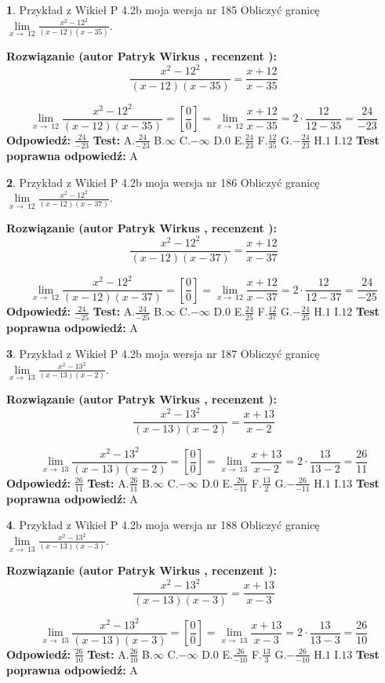 \documentclass[12pt, a4paper]{article}
\theoremstyle{definition} %
\newtheorem{zad}{}
\newcommand{\zadStart}[1]{\begin{zad}#1\newline}
\newcommand{\zadStop}{\end{zad}}
\newcommand{\rozwStart}[2]{\noindent \textbf{Rozwiązanie (autor #1 , recenzent #2): }\newline}
\newcommand{\rozwStop}{\newline}
\newcommand{\odpStart}{\noindent \textbf{Odpowiedź:}\newline}
\newcommand{\odpStop}{\newline}
\newcommand{\testStart}{\noindent \textbf{Test:}\newline}
\newcommand{\testStop}{\newline}
\newcommand{\kluczStart}{\noindent \textbf{Test poprawna odpowiedź:}\newline}
\newcommand{\kluczStop}{\newline}
\begin{document}
\zadStart{Przykład z Wikieł P 4.2b moja wersja nr 185}
Obliczyć granicę $\lim\limits_{x\to\ 12}\frac{x^{2}-12^{2}}{(x-12)(x-35)}$.
\zadStop
\rozwStart{Patryk Wirkus}{}
$$\frac{x^{2}-12^{2}}{(x-12)(x-35)}=\frac{x+12}{x-35}$$

$$\lim\limits_{x\to\ 12}\frac{x^{2}-12^{2}}{(x-12)(x-35)}=[\frac{0}{0}]=\lim\limits_{x\to\ 12}\frac{x+12}{x-35}=2 \cdot \frac{12}{12-35} = \frac{24}{-23}$$
\rozwStop
\odpStart
$\frac{24}{-23}$
\odpStop
\testStart
A.$\frac{24}{-23}$
B.$\infty$
C.$-\infty$
D.$0$
E.$\frac{24}{23}$
F.$\frac{12}{35}$
G.$-\frac{24}{23}$
H.$1$
I.$12$
\testStop
\kluczStart
A
\kluczStop



\zadStart{Przykład z Wikieł P 4.2b moja wersja nr 186}
Obliczyć granicę $\lim\limits_{x\to\ 12}\frac{x^{2}-12^{2}}{(x-12)(x-37)}$.
\zadStop
\rozwStart{Patryk Wirkus}{}
$$\frac{x^{2}-12^{2}}{(x-12)(x-37)}=\frac{x+12}{x-37}$$

$$\lim\limits_{x\to\ 12}\frac{x^{2}-12^{2}}{(x-12)(x-37)}=[\frac{0}{0}]=\lim\limits_{x\to\ 12}\frac{x+12}{x-37}=2 \cdot \frac{12}{12-37} = \frac{24}{-25}$$
\rozwStop
\odpStart
$\frac{24}{-25}$
\odpStop
\testStart
A.$\frac{24}{-25}$
B.$\infty$
C.$-\infty$
D.$0$
E.$\frac{24}{25}$
F.$\frac{12}{37}$
G.$-\frac{24}{25}$
H.$1$
I.$12$
\testStop
\kluczStart
A
\kluczStop



\zadStart{Przykład z Wikieł P 4.2b moja wersja nr 187}
Obliczyć granicę $\lim\limits_{x\to\ 13}\frac{x^{2}-13^{2}}{(x-13)(x-2)}$.
\zadStop
\rozwStart{Patryk Wirkus}{}
$$\frac{x^{2}-13^{2}}{(x-13)(x-2)}=\frac{x+13}{x-2}$$

$$\lim\limits_{x\to\ 13}\frac{x^{2}-13^{2}}{(x-13)(x-2)}=[\frac{0}{0}]=\lim\limits_{x\to\ 13}\frac{x+13}{x-2}=2 \cdot \frac{13}{13-2} = \frac{26}{11}$$
\rozwStop
\odpStart
$\frac{26}{11}$
\odpStop
\testStart
A.$\frac{26}{11}$
B.$\infty$
C.$-\infty$
D.$0$
E.$\frac{26}{-11}$
F.$\frac{13}{2}$
G.$-\frac{26}{-11}$
H.$1$
I.$13$
\testStop
\kluczStart
A
\kluczStop



\zadStart{Przykład z Wikieł P 4.2b moja wersja nr 188}
Obliczyć granicę $\lim\limits_{x\to\ 13}\frac{x^{2}-13^{2}}{(x-13)(x-3)}$.
\zadStop
\rozwStart{Patryk Wirkus}{}
$$\frac{x^{2}-13^{2}}{(x-13)(x-3)}=\frac{x+13}{x-3}$$

$$\lim\limits_{x\to\ 13}\frac{x^{2}-13^{2}}{(x-13)(x-3)}=[\frac{0}{0}]=\lim\limits_{x\to\ 13}\frac{x+13}{x-3}=2 \cdot \frac{13}{13-3} = \frac{26}{10}$$
\rozwStop
\odpStart
$\frac{26}{10}$
\odpStop
\testStart
A.$\frac{26}{10}$
B.$\infty$
C.$-\infty$
D.$0$
E.$\frac{26}{-10}$
F.$\frac{13}{3}$
G.$-\frac{26}{-10}$
H.$1$
I.$13$
\testStop
\kluczStart
A
\kluczStop
\end{document}
